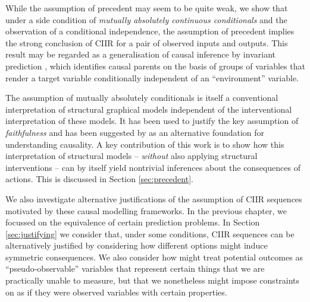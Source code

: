 While the assumption of precedent may seem to be quite weak, we show that under a side condition of \emph{mutually absolutely continuous conditionals} and the observation of a conditional independence, the assumption of precedent implies the strong conclusion of CIIR for a pair of observed inputs and outputs. This result may be regarded as a generalisation of causal inference by invariant prediction \citep{peters_causal_2016}, which identifies causal parents on the basis of groups of variables that render a target variable conditionally independent of an ``environment'' variable.

The assumption of mutually absolutely conditionals is itself a conventional interpretation of structural graphical models independent of the interventional interpretation of these models. It has been used to justify the key assumption of \emph{faithfulness} \citep{meek_strong_1995} and has been suggested by \citet{lemeire_replacing_2013} as an alternative foundation for understanding causality. A key contribution of this work is to show how this interpretation of structural models -- \emph{without} also applying structural interventions -- can by itself yield nontrivial inferences about the consequences of actions. This is discussed in Section \ref{sec:precedent}.

We also investigate alternative justifications of the assumption of CIIR sequences motivated by these causal modelling frameworks. In the previous chapter, we focussed on the equivalence of certain prediction problems. In Section \ref{sec:justifying} we consider that, under some conditions, CIIR sequences can be alternatively justified by considering how different options might induce symmetric consequences. We also consider how might treat potential outcomes as ``pseudo-observable'' variables that represent certain things that we are practically unable to measure, but that we nonetheless might impose constraints on as if they were observed variables with certain properties.


